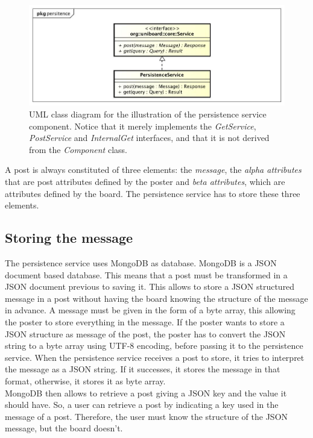 \documentclass[oneside]{scrreprt}
\begin{document}
\begin{figure}[ht]
\centerline{
\includegraphics[width=1.0\textwidth]{figs/persistence-service}}
\caption{UML class diagram for the illustration of the
persistence service component. Notice that it merely implements
the \emph{GetService}, \emph{PostService} and \emph{InternalGet} interfaces, and that it is not derived
from the \emph{Component} class.}
\label{fig:persistence-service}
\end{figure}

A post is always constituted of three elements: the \emph{message}, the \emph{alpha attributes} that are post attributes defined by the poster and \emph{beta attributes}, which are attributes defined by the board. The persistence service has to store these three elements.

\subsection{Storing the message}

The persistence service uses MongoDB as database. MongoDB is a JSON document based database. This means that a post must be transformed in a JSON document previous to saving it. This allows to store a JSON structured message in a post without having the board knowing the structure of the message in advance. A message must be given in the form of a byte array, this allowing the poster to store everything in the message. If the poster wants to store a JSON structure as message of the post, the poster has to convert the JSON string to a byte array using UTF-8 encoding, before passing it to the persistence service. When the persistence service receives a post to store, it tries to interpret the message as a JSON string. If it successes, it stores the message in that format, otherwise, it stores it as byte array. \\
MongoDB then allows to retrieve a post giving a JSON key and the value it should have. So, a user can retrieve a post by indicating a key used in the message of a post. Therefore, the user must know the structure of the JSON message, but the board doesn't.
\end{document}

